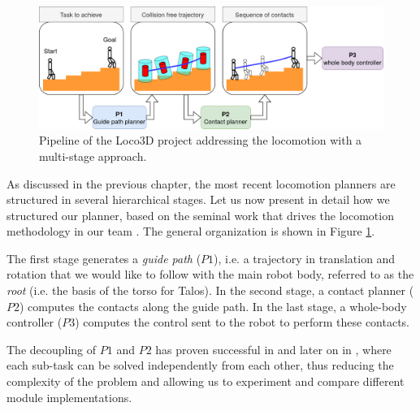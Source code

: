 \begin{figure}[h!]
    \centering
    \includegraphics[width=\textwidth]{Figures/Chapter_LEAS/pipeline.png}
    \caption{Pipeline of the Loco3D project addressing the locomotion with a multi-stage approach.}
    \label{fig:pipeline}
\end{figure}


As discussed in the previous chapter, the most recent locomotion planners are structured in several hierarchical stages. Let us now present in detail how we structured our planner, based on the seminal work that drives the locomotion methodology in our team \cite{loco3d}.
The general organization is shown in Figure \ref{fig:pipeline}.

The first stage generates a \textit{guide path} ($P1$), i.e. a trajectory in translation and rotation that we would like to follow with the main robot body, referred to as the \textit{root} (i.e. the basis of the torso for Talos). In the second stage, a contact planner ($P2$) computes the contacts along the guide path. In the last stage, a whole-body controller ($P3$) computes the control sent to the robot to perform these contacts.

The decoupling of $P1$ and $P2$ has proven successful in \cite{Escande2008Guide, bouyarmane2009} and later on in \cite{loco3d, RB-PRM}, where each sub-task can be solved independently from each other, thus reducing the complexity of the problem and allowing us to experiment and compare different module implementations. 

